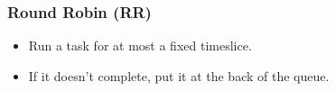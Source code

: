 \begin{frame}

\frametitle{Round Robin (RR)}

\begin{itemize}

\item Run a task for at most a fixed timeslice.

\item If it doesn't complete, put it at the back of the queue.

\end{itemize}

\end{frame}
